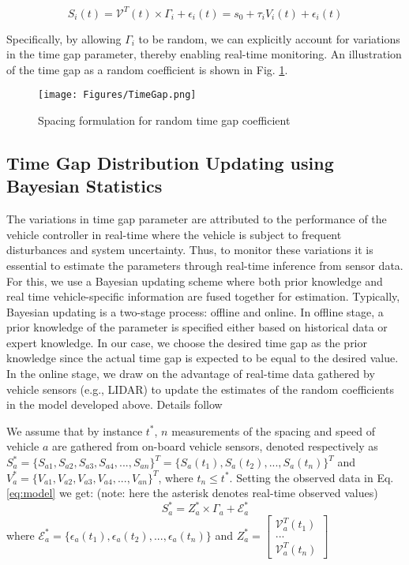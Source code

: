 \documentclass{article}
\begin{document}
\begin{equation}
\label{eq:model}
S_i(t) = \mathcal{V}^T(t) \times \Gamma_i + \epsilon_i(t) = s_0 + \tau_iV_i(t) + \epsilon_i(t)
\end{equation}

Specifically, by allowing $\Gamma_i$ to be random, we can explicitly account for variations in the time gap parameter, thereby enabling real-time monitoring. An illustration of the time gap as a random coefficient is shown in Fig. \ref{fig:random}.

\begin{figure}[!htb]
    \centering
    \centerline{\texttt{[image: Figures/TimeGap.png]}}
    \caption{Spacing formulation for random time gap coefficient}
    \label{fig:random}
\end{figure}

\subsection{Time Gap Distribution Updating using Bayesian Statistics}

The variations in time gap parameter are attributed to the performance of the vehicle controller in real-time where the vehicle is subject to frequent disturbances and system uncertainty. Thus, to monitor these variations it is essential to estimate the parameters through real-time inference from sensor data. For this, we use a Bayesian updating scheme where both prior knowledge and real time vehicle-specific information are fused together for estimation. Typically, Bayesian updating is a two-stage process: offline and online. In offline stage, a prior knowledge of the parameter is specified either based on historical data or expert knowledge. In our case, we choose the desired time gap as the prior knowledge since the actual time gap is expected to be equal to the desired value. In the online stage, we draw on the advantage of real-time data gathered by vehicle sensors (e.g., LIDAR) to update the estimates of the random coefficients in the model developed above. Details follow

We assume that by instance $t^*$, $n$ measurements of the spacing and speed of vehicle $a$ are gathered from on-board vehicle sensors, denoted respectively as $S^*_a = \{S_{a1}, S_{a2}, S_{a3}, S_{a4}, ..., S_{an} \}^T = \{S_a(t_1), S_a(t_2), ..., S_a(t_n)\}^T$ and $V_a^* = \{V_{a1}, V_{a2}, V_{a3}, V_{a4}, ..., V_{an}\}^T$, where $t_n \leq t^*$. Setting the observed data in Eq. \ref{eq:model} we get: (note: here the asterisk denotes real-time observed values)
\begin{equation}
    S_a^*  = Z_a^* \times \Gamma_a + \mathcal{E}_a^*
\end{equation}
where $\mathcal{E}_a^* = \{\epsilon_a(t_1), \epsilon_a(t_2), ..., \epsilon_a(t_n)\}$ and $Z_a^* = \begin{bmatrix} \mathcal{V}^T_a(t_1)\\...\\\mathcal{V}^T_a(t_n) \end{bmatrix}$
\end{document}

